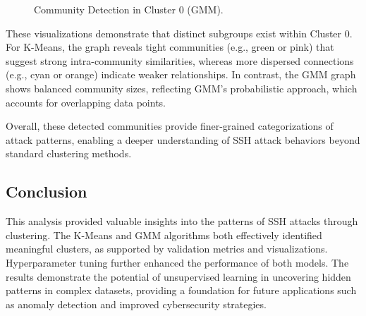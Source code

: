 \begin{figure}[h]
\begin{minipage}[c]{0.47\textwidth}
                        \caption{Community Detection in Cluster 0 (GMM).}
                        \label{fig:gmm_graph}
                    \end{minipage}
                \end{figure}
            
                These visualizations demonstrate that distinct subgroups exist within Cluster 0. For K-Means, the graph reveals tight communities (e.g., green or pink) that suggest strong intra-community similarities, whereas more dispersed connections (e.g., cyan or orange) indicate weaker relationships. In contrast, the GMM graph shows balanced community sizes, reflecting GMM's probabilistic approach, which accounts for overlapping data points. 

                Overall, these detected communities provide finer-grained categorizations of attack patterns, enabling a deeper understanding of SSH attack behaviors beyond standard clustering methods.

    \subsection{Conclusion}
    
        This analysis provided valuable insights into the patterns of SSH attacks through clustering. The K-Means and GMM algorithms both effectively identified meaningful clusters, as supported by validation metrics and visualizations. Hyperparameter tuning further enhanced the performance of both models. The results demonstrate the potential of unsupervised learning in uncovering hidden patterns in complex datasets, providing a foundation for future applications such as anomaly detection and improved cybersecurity strategies.
